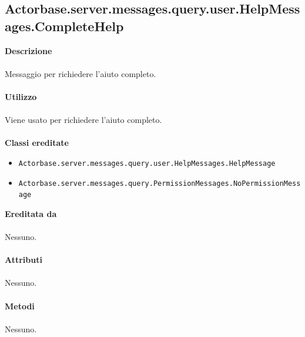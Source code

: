 \documentclass[a4paper]{article}
\begin{document}
	\subsection{Actorbase.server.messages.query.user.HelpMessages.CompleteHelp}
		\textbf{Descrizione}
			\\ \\
			Messaggio per richiedere l'aiuto completo.
			\\ \\
		\textbf{Utilizzo}
			\\ \\
			Viene usato per richiedere l'aiuto completo.
			\\ \\
		\textbf{Classi ereditate}
			\begin{itemize}
				\item \texttt{Actorbase.server.messages.query.user.HelpMessages.HelpMessage}
				\item \texttt{Actorbase.server.messages.query.PermissionMessages.NoPermissionMessage}
			\end{itemize}
		\textbf{Ereditata da}
			\\ \\
			Nessuno.
			\\ \\
		\textbf{Attributi}
			\\ \\
			Nessuno.
			\\ \\
		\textbf{Metodi}
			\\ \\
			Nessuno.	
			
\end{document}
